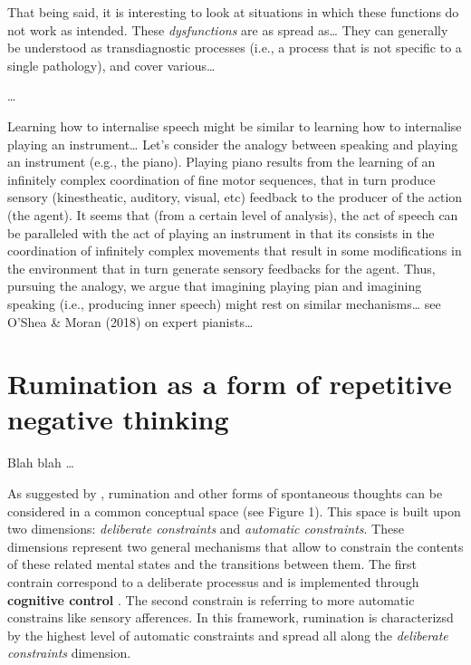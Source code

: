 \documentclass[a4paper,12pt,oneside,oldfontcommands]{memoir}
\begin{document}
That being said, it is interesting to look at situations in which these
functions do not work as intended. These \emph{dysfunctions} \citep[that
can also be considered as
\emph{mis-exadaptation},][]{agnati_possible_2012} are as spread
as\ldots{} They can generally be understood as transdiagnostic processes
(i.e., a process that is not specific to a single pathology), and cover
various\ldots{}

\ldots{}

Learning how to internalise speech might be similar to learning how to
internalise playing an instrument\ldots{} Let's consider the analogy
between speaking and playing an instrument (e.g., the piano). Playing
piano results from the learning of an infinitely complex coordination of
fine motor sequences, that in turn produce sensory (kinestheatic,
auditory, visual, etc) feedback to the producer of the action (the
agent). It seems that (from a certain level of analysis), the act of
speech can be paralleled with the act of playing an instrument in that
its consists in the coordination of infinitely complex movements that
result in some modifications in the environment that in turn generate
sensory feedbacks for the agent. Thus, pursuing the analogy, we argue
that imagining playing pian and imagining speaking (i.e., producing
inner speech) might rest on similar mechanisms\ldots{} see O'Shea \&
Moran (2018) on expert pianists\ldots{}

\section{Rumination as a form of repetitive negative
thinking}\label{rumination-as-a-form-of-repetitive-negative-thinking}

Blah blah \citep{koster_rumination_2013}\ldots{}

As suggested by \citet{Christoff2016}, rumination and other forms of
spontaneous thoughts can be considered in a common conceptual space (see
Figure 1). This space is built upon two dimensions: \emph{deliberate
constraints} and \emph{automatic constraints}. These dimensions
represent two general mechanisms that allow to constrain the contents of
these related mental states and the transitions between them. The first
contrain correspond to a deliberate processus and is implemented through
\textbf{cognitive control} \citep{Miller2000}. The second constrain is
referring to more automatic constrains like sensory afferences. In this
framework, rumination is characterizsd by the highest level of automatic
constraints and spread all along the \emph{deliberate constraints}
dimension.
\end{document}
